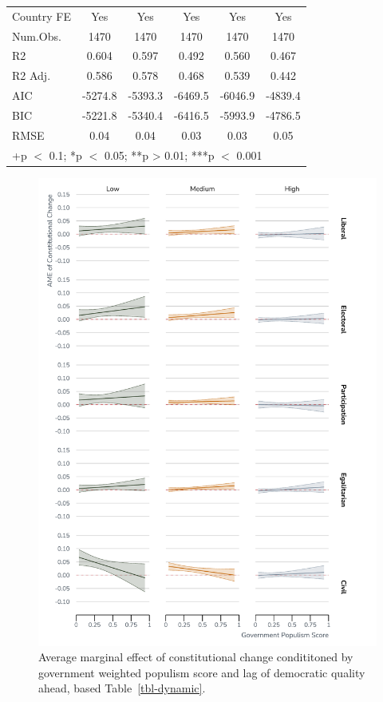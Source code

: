 \documentclass[
  abstract]{article}
\begin{document}
\begin{table}
\begin{tabular}[t]{lccccc}
\midrule
Country FE & Yes & Yes & Yes & Yes & Yes\\
Num.Obs. & 1470 & 1470 & 1470 & 1470 & 1470\\
R2 & 0.604 & 0.597 & 0.492 & 0.560 & 0.467\\
R2 Adj. & 0.586 & 0.578 & 0.468 & 0.539 & 0.442\\
AIC & -5274.8 & -5393.3 & -6469.5 & -6046.9 & -4839.4\\
BIC & -5221.8 & -5340.4 & -6416.5 & -5993.9 & -4786.5\\
RMSE & 0.04 & 0.04 & 0.03 & 0.03 & 0.05\\
\bottomrule
\multicolumn{6}{l}{\rule{0pt}{1em}+p $<$ 0.1; *p $<$ 0.05; **p > 0.01; ***p $<$ 0.001}\\
\end{tabular}
\end{table}

\elandscape

\begin{figure}[H]

{\centering \includegraphics{results/graphs/constchange_dynamic.pdf}

}

\caption{\label{fig-dynamic}Average marginal effect of constitutional
change condititoned by government weighted populism score and lag of
democratic quality ahead, based Table~\ref{tbl-dynamic}.}

\end{figure}
\end{document}
